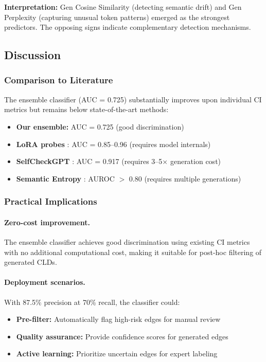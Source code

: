 \textbf{Interpretation:} Gen Cosine Similarity (detecting semantic drift) and Gen Perplexity (capturing unusual token patterns) emerged as the strongest predictors. The opposing signs indicate complementary detection mechanisms.

\subsection{Discussion}

\subsubsection{Comparison to Literature}

The ensemble classifier (AUC = 0.725) substantially improves upon individual CI metrics but remains below state-of-the-art methods:

\begin{itemize}
    \item \textbf{Our ensemble:} AUC = 0.725 (good discrimination)
    \item \textbf{LoRA probes} \citep{arxiv2025lora}: AUC = 0.85--0.96 (requires model internals)
    \item \textbf{SelfCheckGPT} \citep{manakul2023selfcheckgpt}: AUC = 0.917 (requires 3--5$\times$ generation cost)
    \item \textbf{Semantic Entropy} \citep{nature2024}: AUROC $>$ 0.80 (requires multiple generations)
\end{itemize}

\subsubsection{Practical Implications}

\paragraph{Zero-cost improvement.} The ensemble classifier achieves good discrimination using existing CI metrics with no additional computational cost, making it suitable for post-hoc filtering of generated CLDs.

\paragraph{Deployment scenarios.} With 87.5\% precision at 70\% recall, the classifier could:
\begin{itemize}
    \item \textbf{Pre-filter:} Automatically flag high-risk edges for manual review
    \item \textbf{Quality assurance:} Provide confidence scores for generated edges
    \item \textbf{Active learning:} Prioritize uncertain edges for expert labeling
\end{itemize}

